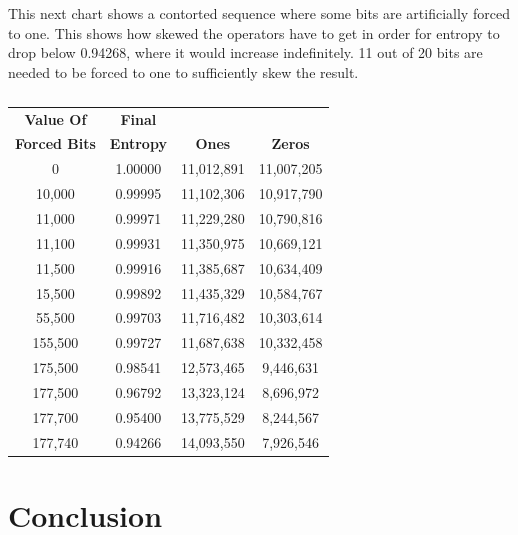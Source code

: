 \documentclass[letterpaper]{article}
\begin{document}
\begin{multicols}{2}
    This next chart shows a contorted sequence where some bits are artificially forced to one. This shows how skewed the operators have to get in order for entropy to drop below 0.94268, where it would increase indefinitely. 11 out of 20 bits are needed to be forced to one to sufficiently skew the result.

    \begin{table}[th]
        \centering
        \begin{tabular}{|c|c|c|c|}
            \hline
            \textbf{Value Of}    & \textbf{Final}   &               &                \\
            \textbf{Forced Bits} & \textbf{Entropy} & \textbf{Ones} & \textbf{Zeros} \\
            \hline
            0                    & 1.00000          & 11,012,891    & 11,007,205     \\
            10,000               & 0.99995          & 11,102,306    & 10,917,790     \\
            11,000               & 0.99971          & 11,229,280    & 10,790,816     \\
            11,100               & 0.99931          & 11,350,975    & 10,669,121     \\
            11,500               & 0.99916          & 11,385,687    & 10,634,409     \\
            15,500               & 0.99892          & 11,435,329    & 10,584,767     \\
            55,500               & 0.99703          & 11,716,482    & 10,303,614     \\
            155,500              & 0.99727          & 11,687,638    & 10,332,458     \\
            175,500              & 0.98541          & 12,573,465    & 9,446,631      \\
            177,500              & 0.96792          & 13,323,124    & 8,696,972      \\
            177,700              & 0.95400          & 13,775,529    & 8,244,567      \\
            177,740              & 0.94266          & 14,093,550    & 7,926,546      \\
            \hline
        \end{tabular}
        \caption{}
    \end{table}

    \section{Conclusion}


\end{multicols}
\end{document}
